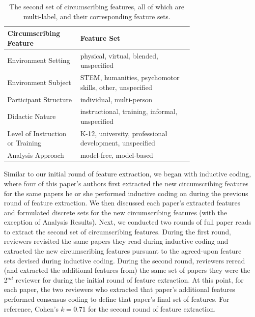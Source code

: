 \documentclass[manuscript,screen,review]{acmart}
\begin{document}
\begin{table}[htbp]
    \renewcommand{\arraystretch}{1.3}%
    \centering
    \caption{The second set of circumscribing features, all of which are multi-label, and their corresponding feature sets.}
    \begin{tabular}{p{0.27\linewidth}@{\hskip .1in} | @{\hskip .1in}p{0.48\linewidth}@{\hskip .1in}}
        \toprule
        Circumscribing Feature & Feature Set\\
        \toprule
        Environment Setting & physical, virtual, blended, unspecified\\
        Environment Subject & STEM, humanities, psychomotor skills, other, unspecified\\
        Participant Structure & individual, multi-person\\
        Didactic Nature & instructional, training, informal, unspecified\\
        Level of Instruction or Training & K-12, university, professional development, unspecified\\
        Analysis Approach & model-free, model-based\\
        \bottomrule
    \end{tabular}
    \label{tab:circumscribing_features_2}
\end{table}

Similar to our initial round of feature extraction, we began with inductive coding, where four of this paper's authors first extracted the new circumscribing features for the same papers he or she performed inductive coding on during the previous round of feature extraction. We then discussed each paper's extracted features and formulated discrete sets for the new circumscribing features (with the exception of Analysis Results). Next, we conducted two rounds of full paper reads to extract the second set of circumscribing features. During the first round, reviewers revisited the same papers they read during inductive coding and extracted the new circumscribing features pursuant to the agreed-upon feature sets devised during inductive coding. During the second round, reviewers reread (and extracted the additional features from) the same set of papers they were the 2$^{nd}$ reviewer for during the initial round of feature extraction. At this point, for each paper, the two reviewers who extracted that paper's additional features performed consensus coding to define that paper's final set of features. For reference, Cohen's $k=0.71$ for the second round of feature extraction.
\end{document}
